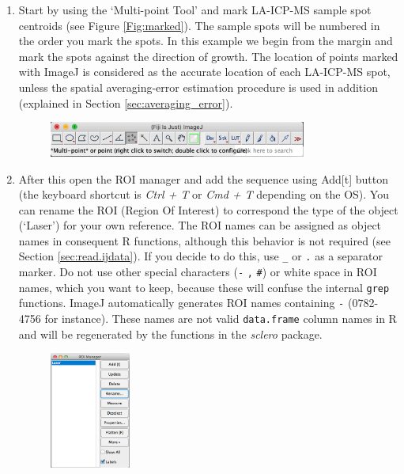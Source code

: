 \documentclass[11pt, a4paper]{article}
\newcommand{\sclero}{\textit{sclero}\xspace}
\begin{document}
\begin{enumerate}
\item Start by using the `Multi-point Tool' and mark LA-ICP-MS sample spot centroids (see Figure \ref{Fig:marked}). The sample spots will be numbered in the order you mark the spots. In this example we begin from the margin and mark the spots against the direction of growth. The location of points marked with ImageJ is considered as the accurate location of each LA-ICP-MS spot, unless the spatial averaging-error estimation procedure is used in addition (explained in Section \ref{sec:averaging_error}).
\begin{figure}[H]
\begin{center}
\includegraphics[width = 0.8\textwidth]{multi_point.png}
\end{center}
\end{figure}
\item After this open the ROI manager and add the sequence using Add[t] button (the keyboard shortcut is \textit{Ctrl + T} or \textit{Cmd + T} depending on the OS). You can rename the ROI (Region Of Interest) to correspond the type of the object (`Laser') for your own reference. The ROI names can be assigned as object names in consequent R functions, although this behavior is not required (see Section \ref{sec:read.ijdata}). If you decide to do this, use \texttt{\_} or \texttt{.} as a separator marker. Do not use other special characters (\texttt{-} \texttt{,} \texttt{\#}) or white space in ROI names, which you want to keep, because these will confuse the internal \texttt{grep} functions. ImageJ automatically generates ROI names containing \texttt{-} (0782-4756 for instance). These names are not valid \texttt{data.frame} column names in R and will be regenerated by the functions in the \sclero package.
\begin{figure}[H]
\begin{center}
\includegraphics[width = 0.25\textwidth]{roi_manager.png}

\end{center}
\end{figure}
\end{enumerate}
\end{document}
